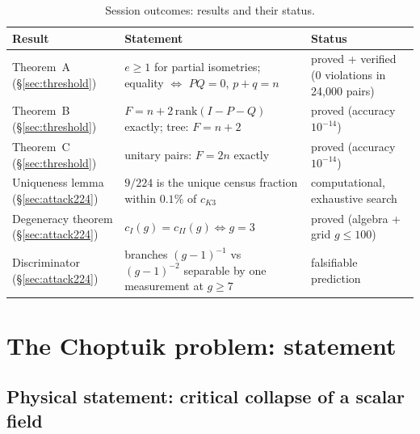 \documentclass[11pt,a4paper]{article}
\theoremstyle{definition}
\theoremstyle{remark}
\begin{document}
\begin{table}[htbp]
\centering
\small
\caption{Session outcomes: results and their status.}
\label{tab:summary}
\begin{tabularx}{\textwidth}{@{}lYY@{}}
\toprule
Result & Statement & Status \\
\midrule
Theorem~A (\S\ref{sec:threshold}) & $e \ge 1$ for partial isometries;
equality $\Leftrightarrow$ $PQ = 0$, $p + q = n$ & proved + verified
(0 violations in 24{,}000 pairs) \\
Theorem~B (\S\ref{sec:threshold}) & $F = n + 2\,\mathrm{rank}(I{-}P{-}Q)$
exactly; tree: $F = n + 2$ & proved (accuracy $10^{-14}$) \\
Theorem~C (\S\ref{sec:threshold}) & unitary pairs: $F = 2n$ exactly &
proved (accuracy $10^{-14}$) \\
Uniqueness lemma (\S\ref{sec:attack224}) & $9/224$ is the unique census
fraction within $0.1\%$ of $c_{K3}$ & computational, exhaustive search \\
Degeneracy theorem (\S\ref{sec:attack224}) & $c_I(g) = c_{II}(g)
\Leftrightarrow g = 3$ & proved (algebra + grid $g \le 100$) \\
Discriminator (\S\ref{sec:attack224}) & branches $(g{-}1)^{-1}$ vs
$(g{-}1)^{-2}$ separable by one measurement at $g \ge 7$ &
falsifiable prediction \\
\bottomrule
\end{tabularx}
\end{table}

\section{The Choptuik problem: statement}\label{sec:statement}

\subsection{Physical statement: critical collapse of a scalar field}
\end{document}
